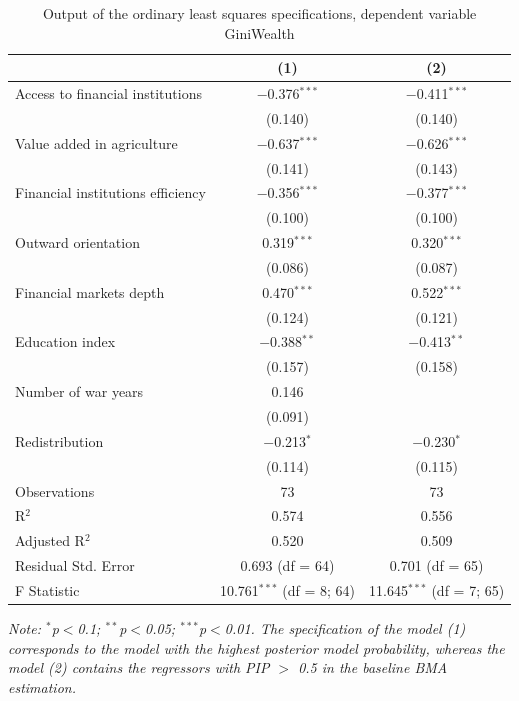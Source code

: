 \begin{refsection}
\begin{subappendices}
  \begin{table}[!htbp] 
  \centering 
  \caption{Output of the ordinary least squares specifications, dependent variable GiniWealth} 
  \label{ch3res:ols}
  \begin{threeparttable}
  \begin{tabular}{@{\extracolsep{5pt}}lcc} 
  \toprule
    & (1) & (2) \\ 
  \midrule
   Access to financial institutions & $-$0.376$^{***}$ & $-$0.411$^{***}$ \\ 
    & (0.140) & (0.140) \\ 
   Value added in agriculture & $-$0.637$^{***}$ & $-$0.626$^{***}$ \\ 
    & (0.141) & (0.143) \\ 
   Financial institutions efficiency & $-$0.356$^{***}$ & $-$0.377$^{***}$ \\ 
    & (0.100) & (0.100) \\ 
   Outward orientation & 0.319$^{***}$ & 0.320$^{***}$ \\ 
    & (0.086) & (0.087) \\ 
   Financial markets depth & 0.470$^{***}$ & 0.522$^{***}$ \\ 
    & (0.124) & (0.121) \\ 
   Education index & $-$0.388$^{**}$ & $-$0.413$^{**}$ \\ 
    & (0.157) & (0.158) \\ 
   Number of war years & 0.146 &  \\ 
    & (0.091) &  \\ 
   Redistribution & $-$0.213$^{*}$ & $-$0.230$^{*}$ \\ 
    & (0.114) & (0.115) \\ 
  \midrule 
  Observations & 73 & 73 \\ 
  R$^{2}$ & 0.574 & 0.556 \\ 
  Adjusted R$^{2}$ & 0.520 & 0.509 \\ 
  Residual Std. Error & 0.693 (df = 64) & 0.701 (df = 65) \\ 
  F Statistic & 10.761$^{***}$ (df = 8; 64) & 11.645$^{***}$ (df = 7; 65) \\
  \bottomrule
  \end{tabular}
  \begin{tablenotes}
  \footnotesize
  \item \textit{Note: {$^{*}$p$<$0.1; $^{**}$p$<$0.05; $^{***}$p$<$0.01.} The specification of the model (1) corresponds to the model with the highest posterior model probability, whereas the model (2) contains the regressors with \ac{PIP} $>$ 0.5 in the baseline \ac{BMA} estimation.}
  \end{tablenotes}
  \end{threeparttable}
  \end{table}
  \clearpage

\end{subappendices}
\end{refsection}
